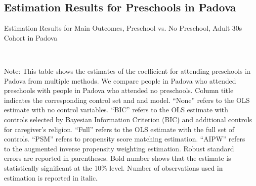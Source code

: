 \subsection{Estimation Results for Preschools in Padova} \label{subsection:padova-estimation}




\begin{table}[H] \caption{Estimation Results for Main Outcomes, Preschool vs. No Preschool, Adult 30s Cohort in Padova} \label{ols-M-adult30-reg-pres-padova}
\scalebox{0.7}{}
\vspace{1ex} \\
\footnotesize\raggedright{Note: This table shows the estimates of the coefficient for attending preschools in Padova from multiple methods. We compare people in Padova who attended preschools with people in Padova who attended no preschools. Column title indicates the corresponding control set and and model. ``None'' refers to the OLS estimate with no control variables. ``BIC'' refers to the OLS estimate with controls selected by Bayesian Information Criterion (BIC) and additional controls for caregiver's religion. ``Full'' refers to the OLS estimate with the full set of controls. ``PSM'' refers to propensity score matching estimation. ``AIPW'' refers to the augmented inverse propensity weighting estimation. Robust standard errors are reported in parentheses. Bold number shows that the estimate is statistically significant at the 10\% level. Number of observations used in estimation is reported in italic.}

\end{table}




